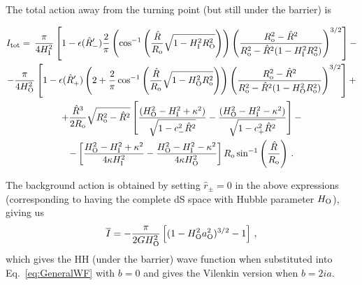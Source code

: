 \documentclass[11pt,a4paper]{article}
\begin{document}
The total action away from the turning point (but still under the barrier) is

\begin{small}
\begin{equation}
\begin{gathered}
\label{eq:B1i}
I_{\rm tot} = \, \frac{\pi}{4H_{\rm I}^{2}}\left[1-\epsilon(\hat R^{\prime}_{-}) \frac{2}{\pi} \left(\cos^{-1}\left(\frac{\hat R}{R_{\rm o}}\sqrt{1 - H_{\rm I}^{2} R_{\rm O}^{2}}\right)\right)\left(\frac{R_{\rm o}^{2} - \hat R^{2}}{R_{\rm o}^{2} - \hat R^{2}(1 - H_{\rm I}^{2} R_{\rm o}^{2})}\right)^{3/2}\right] - \\  
- \frac{\pi}{4 H_{\rm O}^{2}} \left[1 - \epsilon(\hat R^{\prime}_{+}) \left(2 + \frac{2}{\pi} \cos^{-1}\left(\frac{\hat R}{R_{\rm o}}\sqrt{1-H_{\rm O}^{2} R_{\rm o}^{2}}\right)\right)\left(\frac{R_{\rm o}^{2}-\hat R^{2}}{R_{\rm o}^{2} - \hat R^{2}(1 - H_{\rm O}^{2} R_{\rm o}^{2})}\right)^{3/2} \right] + \\ 
+ \frac{\hat R^{3}}{2 R_{\rm o}} \sqrt{R_{\rm o}^{2} - \hat R^{2}}  \left[\frac{(H_{\rm O}^{2} - H_{\rm I}^{2} + \kappa^{2})}{\sqrt{1 - c_{-}^{2}\hat R^{2}}} - \frac{(H_{\rm O}^{2} - H_{\rm I}^{2}-\kappa^{2})}{\sqrt{1 - c_{+}^{2}\hat R^{2}}}\right] - \\
- \left[\frac{H_{\rm O}^{2} - H_{\rm I}^{2} + \kappa^{2}}{4 \kappa H_{\rm I}^{2}} - \frac{H_{\rm O}^{2} - H_{\rm I}^{2} - \kappa^{2}}{4 \kappa H_{\rm O}^{2}}\right] R_{\rm o} \sin^{-1} \left(\frac{\hat R}{R_{\rm o}}\right) \,.
\end{gathered}
\end{equation}
\end{small}






The background action is obtained by setting $\hat{r}_{\pm}=0$ in the above expressions (corresponding to having the complete dS space with Hubble parameter $H_{\rm O}$), giving us
\begin{equation}
\overline{I} = -\frac{\pi}{2 G H_{\rm O}^{2}}\left[(1 - H_{\rm O}^{2} a_{\rm O}^{2})^{3/2} - 1 \right] \,,\label{eq:HHV}
\end{equation}
which gives the HH (under the barrier) wave function when
substituted into Eq.~\eqref{eq:GeneralWF} with $b=0$ and gives the Vilenkin version when $b=2ia$.
\end{document}
